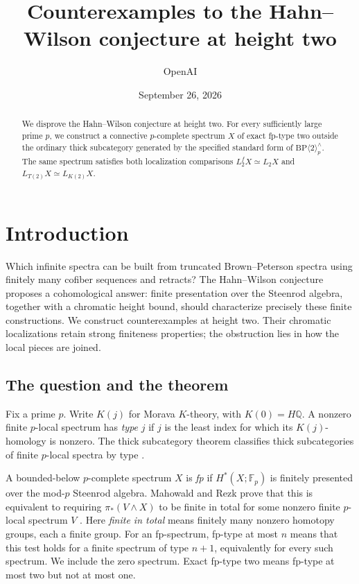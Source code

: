 \documentclass[11pt]{article}
\title{Counterexamples to the Hahn--Wilson conjecture at height two}
\author{OpenAI}
\date{September 26, 2026}
\newcommand{\BP}{\mathrm{BP}}
\newcommand{\F}{\mathbb F}
\newcommand{\Q}{\mathbb Q}
\theoremstyle{definition}
\theoremstyle{remark}
\numberwithin{equation}{section}
\begin{document}
\maketitle
\begin{abstract}
We disprove the Hahn--Wilson conjecture at height two. For every sufficiently
large prime $p$, we construct a connective $p$-complete spectrum $X$ of exact
fp-type two outside the ordinary thick subcategory generated by the specified
standard form of $\BP\langle2\rangle_p^\wedge$. The same spectrum satisfies
both localization comparisons
$L_2^fX\simeq L_2X$ and $L_{T(2)}X\simeq L_{K(2)}X$.
\end{abstract}

\section{Introduction}\label{sec:introduction}

Which infinite spectra can be built from truncated Brown--Peterson
spectra using finitely many cofiber sequences and retracts?
The Hahn--Wilson conjecture proposes a cohomological answer: finite
presentation over the Steenrod algebra, together with a chromatic
height bound, should characterize precisely these finite constructions.
We construct counterexamples at height two. Their chromatic
localizations retain strong finiteness properties; the obstruction
lies in how the local pieces are joined.

\subsection{The question and the theorem}

Fix a prime $p$. Write $K(j)$ for Morava $K$-theory, with $K(0)=H\Q$.
A nonzero finite $p$-local spectrum has \emph{type} $j$ if $j$ is the
least index for which its $K(j)$-homology is nonzero. The thick
subcategory theorem classifies thick subcategories of finite
$p$-local spectra by type
\cite{HS1998}.

A bounded-below $p$-complete spectrum $X$ is \emph{fp} if
$H^*(X;\F_p)$ is finitely presented over the mod-$p$ Steenrod algebra.
Mahowald and Rezk prove that this is equivalent to requiring
$\pi_*(V\wedge X)$ to be finite in total for some nonzero finite
$p$-local spectrum $V$ \cite[Proposition~3.2]{MR1999}.
Here \emph{finite in total} means finitely many nonzero homotopy
groups, each a finite group. For an fp-spectrum, fp-type at most $n$
means that this test holds for a finite spectrum of type $n+1$,
equivalently for every such spectrum. We include the zero spectrum.
Exact fp-type two means fp-type at most two but not at most one.
\end{document}
